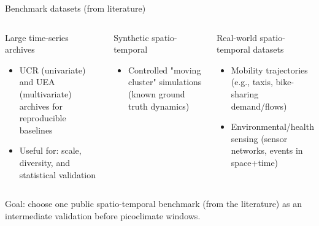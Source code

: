 \documentclass[aspectratio=169]{beamer}
\begin{document}
\begin{frame}{Benchmark datasets (from literature)}
  \begin{columns}[T,onlytextwidth]
    \begin{block}{Large time-series archives}
      \begin{itemize}
        \item UCR (univariate) and UEA (multivariate) archives for reproducible baselines
        \item Useful for: scale, diversity, and statistical validation
      \end{itemize}
    \end{block}

    \begin{block}{Synthetic spatio-temporal}
      \begin{itemize}
        \item Controlled "moving cluster" simulations (known ground truth dynamics)
      \end{itemize}
    \end{block}

    \begin{block}{Real-world spatio-temporal datasets}
      \begin{itemize}
        \item Mobility trajectories (e.g., taxis, bike-sharing demand/flows)
        \item Environmental/health sensing (sensor networks, events in space+time)
      \end{itemize}
    \end{block}
  \end{columns}

  \vspace{0.3em}
  \footnotesize Goal: choose one public spatio-temporal benchmark (from the literature) as an intermediate validation before picoclimate windows.
\end{frame}
\end{document}
